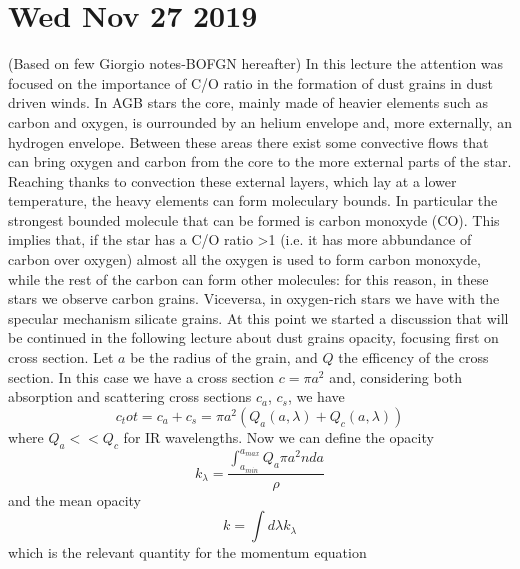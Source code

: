 \documentclass[main.tex]{subfiles}
\begin{document}
\section*{Wed Nov 27 2019}

(Based on few Giorgio notes-BOFGN hereafter) In this lecture the attention was focused on the importance of C/O ratio in the formation of dust grains in dust driven winds. In AGB stars the core, mainly made of heavier elements such as carbon and oxygen, is ourrounded by an helium envelope and, more externally, an hydrogen envelope. Between these areas there exist some convective flows that can bring oxygen and carbon from the core to the more external parts of the star. Reaching thanks to convection these external layers, which lay at a lower temperature, the heavy elements can form moleculary bounds. In particular the strongest bounded molecule that can be formed is carbon monoxyde (CO). This implies that, if the star has a C/O ratio >1 (i.e. it has more abbundance of carbon over oxygen) almost all the oxygen is used to form carbon monoxyde, while the rest of the carbon can form other molecules: for this reason, in these stars we observe carbon grains. Viceversa, in oxygen-rich stars we have with the specular mechanism silicate grains. At this point we started a discussion that will be continued in the following lecture about dust grains opacity, focusing first on cross section.
Let $a$ be the radius of the grain, and $Q$ the efficency of the cross section. In this case we have a cross section $c=\pi a^2$ and, considering both absorption and scattering cross sections $c_a$, $c_s$, we have
\begin{equation}
c_tot=c_a+c_s=\pi a^2(Q_a(a,\lambda)+Q_c(a,\lambda))
\end{equation}
where $Q_a<<Q_c$ for IR wavelengths.
Now we can define the opacity
\begin{equation}
k_\lambda=\frac{\int_{a_{min}}^{a_{max}}Q_a\pi a^2 n da}{\rho}
\end{equation}
and the mean opacity
\begin{equation}
k=\int d\lambda k_\lambda
\end{equation}
which is the relevant quantity for the momentum equation
\end{document}
